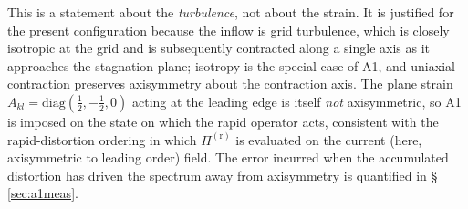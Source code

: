 \documentclass[11pt,a4paper]{article}
\begin{document}
This is a statement about the \emph{turbulence}, not about the strain. It is
justified for the present configuration because the inflow is grid turbulence,
which is closely isotropic at the grid and is subsequently contracted along a
single axis as it approaches the stagnation plane; isotropy is the special
case of A1, and uniaxial contraction preserves axisymmetry about the
contraction axis. The plane strain $A_{kl}=\mathrm{diag}(\tfrac12,-\tfrac12,0)$
acting at the leading edge is itself \emph{not} axisymmetric, so A1 is imposed
on the state on which the rapid operator acts, consistent with the
rapid-distortion ordering in which $\Pi^{(\mathrm r)}$ is evaluated on the
current (here, axisymmetric to leading order) field. The error incurred when
the accumulated distortion has driven the spectrum away from axisymmetry is
quantified in \S\,\ref{sec:a1meas}.
\end{document}
